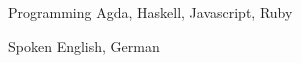 

\begin{cvskills}

  \cvskill
    {Programming} %
    {Agda, Haskell, Javascript, Ruby} %


  \cvskill
    {Spoken} %
    {English, German} %

\end{cvskills}
